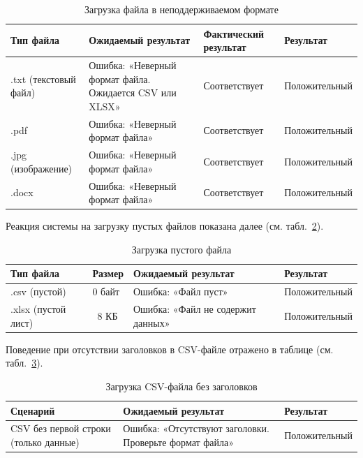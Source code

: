 \begin{table}[!htb]
\caption{\label{tab:stressInvalidFormat}Загрузка файла в неподдерживаемом формате}
\small
\begin{center}
\vspace{-0.5cm}\begin{tabular}{|p{4.5cm}|p{4.5cm}|p{3cm}|p{3cm}|}
\hline
Тип файла & Ожидаемый результат & Фактический результат & Результат \\ \hline
.txt (текстовый файл) & Ошибка: «Неверный формат файла. Ожидается CSV или XLSX» & Соответствует & Положительный \\ \hline
.pdf & Ошибка: «Неверный формат файла» & Соответствует & Положительный \\ \hline
.jpg (изображение) & Ошибка: «Неверный формат файла» & Соответствует & Положительный \\ \hline
.docx & Ошибка: «Неверный формат файла» & Соответствует & Положительный \\ \hline
\end{tabular}
\end{center}
\end{table}

Реакция системы на загрузку пустых файлов показана далее (см. табл.~\ref{tab:stressEmptyFile}).

\begin{table}[!htb]
\caption{\label{tab:stressEmptyFile}Загрузка пустого файла}
\small
\begin{center}
\vspace{-0.5cm}\begin{tabular}{|p{3.5cm}|p{1.5cm}|p{7cm}|p{3cm}|}
\hline
Тип файла & Размер & Ожидаемый результат & Результат \\ \hline
.csv (пустой) & 0 байт & Ошибка: «Файл пуст» & Положительный \\ \hline
.xlsx (пустой лист) & ~8 КБ & Ошибка: «Файл не содержит данных» & Положительный \\ \hline
\end{tabular}
\end{center}
\end{table}

Поведение при отсутствии заголовков в CSV-файле отражено в таблице (см. табл.~\ref{tab:stressNoHeader}).

\begin{table}[!htb]
\caption{\label{tab:stressNoHeader}Загрузка CSV-файла без заголовков}
\small
\begin{center}
\vspace{-0.5cm}\begin{tabular}{|p{4cm}|p{8cm}|p{3cm}|}
\hline
Сценарий & Ожидаемый результат & Результат \\ \hline
CSV без первой строки (только данные) & Ошибка: «Отсутствуют заголовки. Проверьте формат файла» & Положительный \\ \hline
\end{tabular}
\end{center}
\end{table}

